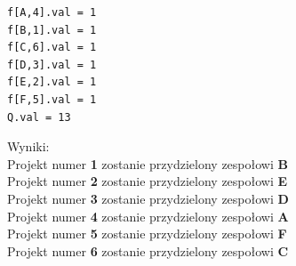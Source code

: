 \begin{lstlisting}[caption=wynik z glpk]
f[A,4].val = 1
f[B,1].val = 1
f[C,6].val = 1
f[D,3].val = 1
f[E,2].val = 1
f[F,5].val = 1
Q.val = 13
\end{lstlisting}
Wyniki: \\
Projekt numer \textbf{1} zostanie przydzielony zespołowi \textbf{B} \\
Projekt numer \textbf{2} zostanie przydzielony zespołowi \textbf{E} \\
Projekt numer \textbf{3} zostanie przydzielony zespołowi \textbf{D} \\
Projekt numer \textbf{4} zostanie przydzielony zespołowi \textbf{A} \\
Projekt numer \textbf{5} zostanie przydzielony zespołowi \textbf{F} \\
Projekt numer \textbf{6} zostanie przydzielony zespołowi \textbf{C} \\
